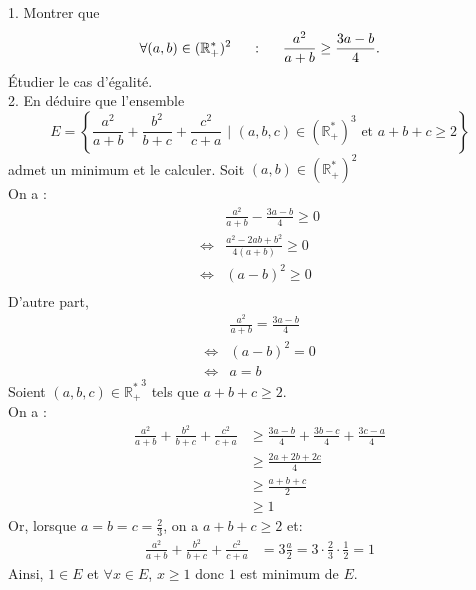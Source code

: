 \documentclass[11pt]{article}
\begin{document}
\begin{exercice}{}{}
    1. Montrer que
    \begin{equation*}
        \forall(a,b)\in(\mathbb{R}^*_+)^2\hspace{0.5cm}:\hspace{0.5cm}\frac{a^2}{a+b}\geq\frac{3a-b}{4}.
    \end{equation*}
    Étudier le cas d'égalité.\\
    2. En déduire que l'ensemble
    \begin{equation*}
        E=\left\{\frac{a^2}{a+b}+\frac{b^2}{b+c}+\frac{c^2}{c+a} \text{ | } (a,b,c)\in(\mathbb{R^*_+})^3 \text{ et } a+b+c\geq2 \right\}
    \end{equation*}
    admet un minimum et le calculer.
    \tcblower
     Soit $(a,b)\in(\mathbb{R}^*_+)^2$\\
    On a :
    \begin{align*}
        &\frac{a^2}{a+b}-\frac{3a-b}{4}\geq0\\
        \iff&\frac{a^2-2ab+b^2}{4(a+b)}\geq0\\
        \iff&(a-b)^2\geq0\\
    \end{align*}
    D'autre part,
    \begin{align*}
        &\frac{a^2}{a+b}=\frac{3a-b}{4}\\
        \iff&(a-b)^2=0\\
        \iff&a=b
    \end{align*}
     Soient $(a,b,c)\in\mathbb{R^*_+}^3$ tels que $a+b+c\geq2$.\\
    On a :
    \begin{align*}
        \frac{a^2}{a+b}+\frac{b^2}{b+c}+\frac{c^2}{c+a}
        &\geq\frac{3a-b}{4}+\frac{3b-c}{4}+\frac{3c-a}{4}\\
        &\geq\frac{2a+2b+2c}{4}\\
        &\geq\frac{a+b+c}{2}\\
        &\geq1
    \end{align*}
    Or, lorsque $a=b=c=\frac{2}{3}$, on a $a+b+c\geq2$ et:
    \begin{align*}
        \frac{a^2}{a+b}+\frac{b^2}{b+c}+\frac{c^2}{c+a}
        &=3\frac{a}{2}=3\cdot\frac{2}{3}\cdot\frac{1}{2}=1
    \end{align*}
    Ainsi, $1\in E$ et $\forall{x\in E}$, $x\geq1$ donc $1$ est minimum de $E$.
\end{exercice}
\end{document}
